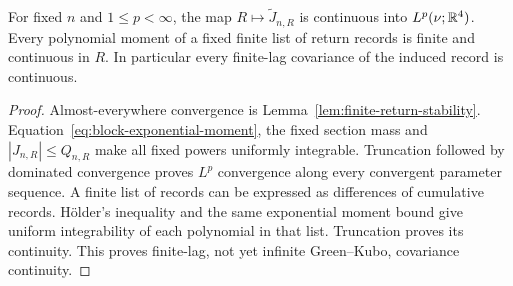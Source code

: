 \begin{corollary}
\label{cor:all-moment-continuity}
For fixed $n$ and $1\le p<\infty$, the map
$R\mapsto\widetilde J_{n,R}$ is continuous into $L^p(\nu;\mathbb R^4)$.
Every polynomial moment of a fixed finite list of return records is
finite and continuous in $R$. In particular every finite-lag covariance
of the induced record is continuous.
\end{corollary}
\begin{proof}
Almost-everywhere convergence is Lemma~\ref{lem:finite-return-stability}.
Equation~\eqref{eq:block-exponential-moment}, the fixed section mass and
$|J_{n,R}|\le Q_{n,R}$ make all fixed powers uniformly integrable.
Truncation followed by dominated convergence proves $L^p$ convergence
along every convergent parameter sequence. A finite list of records can
be expressed as differences of cumulative records. H\"older's inequality
and the same exponential moment bound give uniform integrability of each
polynomial in that list. Truncation proves its continuity. This proves
finite-lag, not yet infinite Green--Kubo, covariance continuity.
\end{proof}
